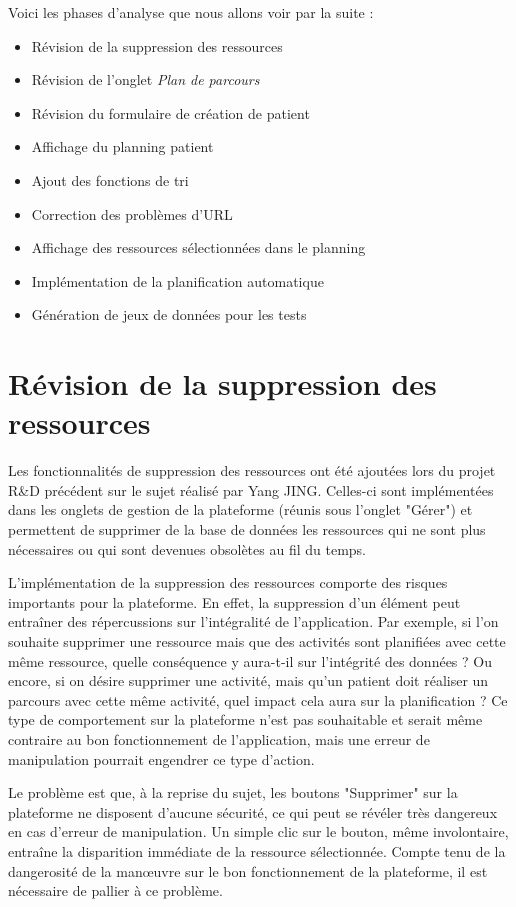\documentclass[noposter]{polytech/polytech}
\begin{document}
Voici les phases d'analyse que nous allons voir par la suite : 

\begin{itemize}
	\item Révision de la suppression des ressources
	\item Révision de l'onglet \textit{Plan de parcours}
	\item Révision du formulaire de création de patient
	\item Affichage du planning patient
	\item Ajout des fonctions de tri
	\item Correction des problèmes d'URL
	\item Affichage des ressources sélectionnées dans le planning
	\item Implémentation de la planification automatique
	\item Génération de jeux de données pour les tests
\end{itemize}


\section{Révision de la suppression des ressources}
\label{sec:suppr}

Les fonctionnalités de suppression des ressources ont été ajoutées lors du projet R\&D précédent sur le sujet réalisé par Yang JING. Celles-ci sont implémentées dans les onglets de gestion de la plateforme (réunis sous l'onglet "Gérer") et permettent de supprimer de la base de données les ressources qui ne sont plus nécessaires ou qui sont devenues obsolètes au fil du temps. 

L'implémentation de la suppression des ressources comporte des risques importants pour la plateforme. En effet, la suppression d'un élément peut entraîner des répercussions sur l'intégralité de l'application. Par exemple, si l'on souhaite supprimer une ressource mais que des activités sont planifiées avec cette même ressource, quelle conséquence y aura-t-il sur l'intégrité des données ? Ou encore, si on désire supprimer une activité, mais qu'un patient doit réaliser un parcours avec cette même activité, quel impact cela aura sur la planification ? Ce type de comportement sur la plateforme n'est pas souhaitable et serait même contraire au bon fonctionnement de l'application, mais une erreur de manipulation pourrait engendrer ce type d'action. 

Le problème est que, à la reprise du sujet, les boutons "Supprimer" sur la plateforme ne disposent d'aucune sécurité, ce qui peut se révéler très dangereux en cas d'erreur de manipulation. Un simple clic sur le bouton, même involontaire, entraîne la disparition immédiate de la ressource sélectionnée. Compte tenu de la dangerosité de la manœuvre sur le bon fonctionnement de la plateforme, il est nécessaire de pallier à ce problème. 
\end{document}
